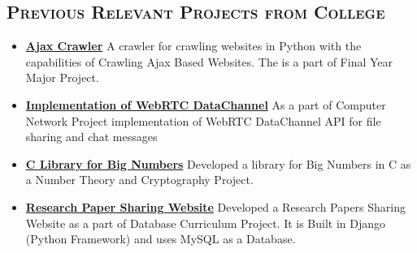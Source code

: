 \begin{resume}

\section{\textsc{Previous Relevant Projects from College}}

\begin{itemize}

\item \textbf{\href{https://github.com/dip-kush/workflow_validation_temp}{\textbf{Ajax Crawler}}}
A crawler for crawling websites in Python with the capabilities of Crawling Ajax   
Based Websites. The is a part of Final Year Major Project.

\item \textbf{\href{https://github.com/dip-kush/crypto_project}{\textbf{Implementation of WebRTC DataChannel}}}
As a part of Computer Network Project implementation of WebRTC DataChannel API for file sharing and chat messages

\item \textbf{{\href{https://github.com/dip-kush/crypto_project}{\textbf{C Library for Big Numbers}}}}
Developed a library for Big Numbers in C as a Number Theory and Cryptography Project.

\item \textbf{{\href{https://github.com/dip-kush/dbms_django_project}{\textbf{Research Paper Sharing Website}}}}
Developed a Research Papers Sharing Website as a part of Database Curriculum Project. 
It is Built in Django (Python Framework) and uses MySQL as a Database.


\end{itemize}
\end{resume}
